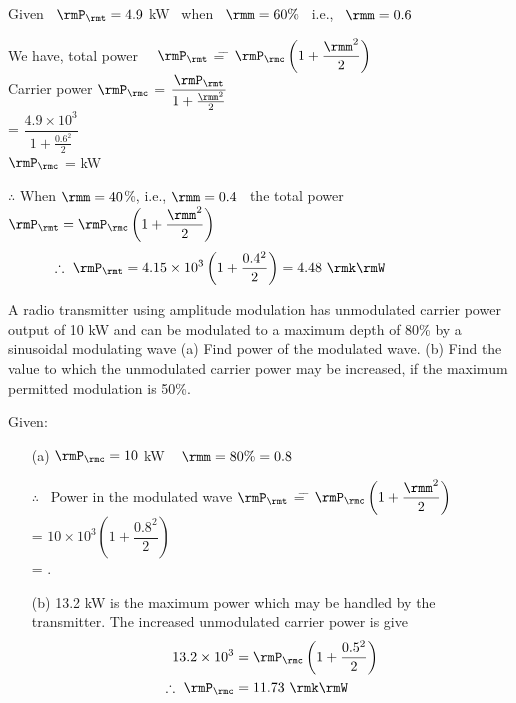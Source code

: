 \begin{solution}
Given ~$\rmP_\rmt = 4.9$ kW ~when~ $\rmm=60\%$ ~i.e.,~ $\rmm=0.6$

\medskip
\begin{tabbing}
We have, total power ~~$\rmP_\rmt$ \= = \= $\rmP_\rmc \left(1+\dfrac{\rmm^2}{2} \right) $\\[0.2cm]
\hspace{1.15cm} Carrier power $\rmP_\rmc$ \> = \> $\dfrac{\rmP_\rmt}{1 + \frac{\rmm^2}{2}}$\\[0.2cm]
\> = \> $\dfrac{4.9 \times 10^3}{1+\frac{0.6^2}{2}}$\\[0.2cm]
\hspace{3.4cm} $\rmP_\rmc$ \> =  kW
\end{tabbing}
$\therefore$ When $\rmm=40$\%, i.e.,  $\rmm=0.4$ ~the total power ~$\rmP_\rmt
=\rmP_\rmc  \left(1+\dfrac{\rmm^2}{2} \right)$
$$ 
\therefore ~ \rmP_\rmt = 4.15 \times 10^3 \left(1+\dfrac{0.4^2}{2} \right) =
4.48 ~\rmk\rmW \hspace{2cm}
$$
\end{solution}

\begin{problem}\label{prob8.10}
A radio transmitter using amplitude modulation has unmodulated
carrier power output of 10 kW and can be modulated to a maximum depth
of 80\%  by a sinusoidal modulating wave (a) Find power of the
modulated wave. (b) Find the value to which the unmodulated carrier
power may be increased, if the maximum permitted modulation is 50\%.
\end{problem}

\begin{solution}
Given: 
\begin{itemize}
\item[(a)] $\rmP_\rmc = 10$ kW ~ $\rmm=80\% = 0.8$
\begin{tabbing}
$\therefore $~ Power in the modulated wave $\rmP_\rmt$
\= = \= $\rmP_\rmc \left(1+\dfrac{\rmm^2}{2} \right)$\\[4pt]
\> = \> $10 \times 10^3 \left(1+ \dfrac{0.8^2}{2} \right)$\\
\> =  \rmk\rmW.
\end{tabbing}

\item[(b)] 13.2 kW is the maximum power which may be handled by the
transmitter. The increased unmodulated carrier power is give 
\begin{align*}
13.2 \times 10^3 & = \rmP_\rmc \left(1+\dfrac{0.5^2}{2} \right)\\
\therefore  ~\rmP_\rmc & = 11.73 ~\rmk\rmW
\end{align*}
\end{itemize}
\end{solution}

